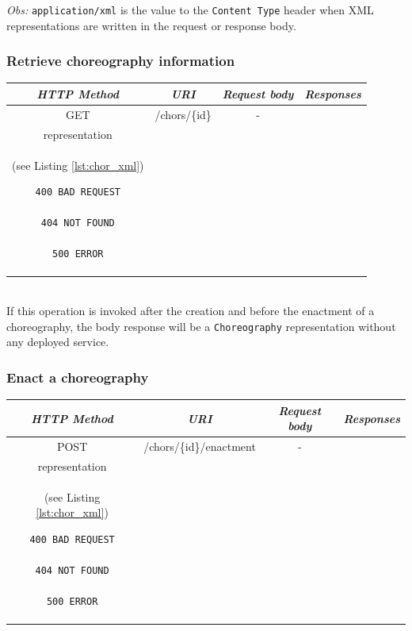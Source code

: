 \emph{Obs:} \texttt{application/xml} is the value to the \texttt{Content Type} header when XML representations are written in the request or response body. 

\subsubsection*{Retrieve choreography information}

\begin{tabular}{|c|c|c|c|}
\hline 
\itshape{HTTP Method} & \itshape{URI} & \itshape{Request body} & \itshape{Responses} \\ 
\hline 
GET & /chors/\{id\} & - &
\begin{minipage}{2in}
\begin{verbatim}

200 OK
location = "/chors/{id}"

Body: 
\end{verbatim}
\verb!Choreography! XML \\
representation \\
(see Listing \ref{lst:chor_xml})
\begin{verbatim}
400 BAD REQUEST

404 NOT FOUND

500 ERROR

\end{verbatim}
\end{minipage} 
\\ 
\hline 
\end{tabular} \\

If this operation is invoked after the creation and before the enactment of a choreography, the body response will be a \verb!Choreography! representation without any deployed service.

\subsubsection*{Enact a choreography}

\begin{tabular}{|c|c|c|c|}
\hline 
\itshape{HTTP Method} & \itshape{URI} & \itshape{Request body} & \itshape{Responses} \\ 
\hline 
POST & /chors/\{id\}/enactment & - &
\begin{minipage}{2in}
\begin{verbatim}

200 OK
location = "/chors/{id}"
Body: 
\end{verbatim}
\verb!Choreography! XML \\
representation \\
(see Listing \ref{lst:chor_xml})
\begin{verbatim}
400 BAD REQUEST

404 NOT FOUND

500 ERROR

\end{verbatim}
\end{minipage} 
\\ 
\hline 
\end{tabular} \\

